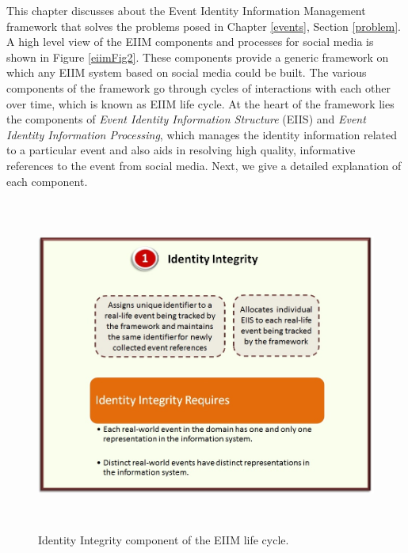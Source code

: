 This chapter discusses about the Event Identity Information Management framework that solves the problems posed in Chapter \ref{events}, Section \ref{problem}. A high level view of the EIIM components and processes for social media is shown in Figure \ref{eiimFig2}. These components provide a generic framework on which any EIIM system based on social media could be built. The various components of the framework go through cycles of interactions with each other over time, which is known as EIIM life cycle. At the heart of the framework lies the components of \textit{Event Identity Information Structure} (EIIS) and \textit{Event Identity Information Processing}, which manages the identity information related to a particular event and also aids in resolving high quality, informative references to the event from social media. Next, we give a detailed explanation of each component.




\begin{figure}[htbp]
  \caption{Identity Integrity component of the EIIM life cycle.}
  \centering
    \includegraphics[width=14cm,height=11cm]{Figures/EIIMComponents/IdentityIntegrity.jpg}
\end{figure}

